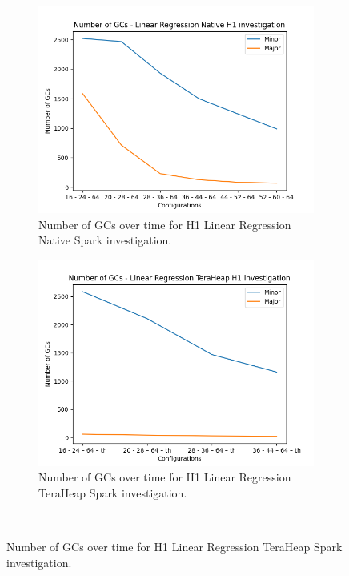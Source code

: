 \begin{figure}[htbp]
	\centering
    \begin{subfigure}[b]{0.48\textwidth}
    \includegraphics[width=\linewidth]{./fig/gcs_linr_h1_native.png}
    \caption{Number of GCs over time for H1 Linear Regression Native
    Spark investigation.}
    \label{fig:gcs_linr_h1_native}
    \end{subfigure}

    \begin{subfigure}[b]{0.48\textwidth}
    \includegraphics[width=\linewidth]{./fig/gcs_linr_h1_th.png}
    \caption{Number of GCs over time for H1 Linear Regression TeraHeap
    Spark investigation.}
    \label{fig:gcs_linr_h1_th}
    \end{subfigure}\\[1em]
\end{figure}

